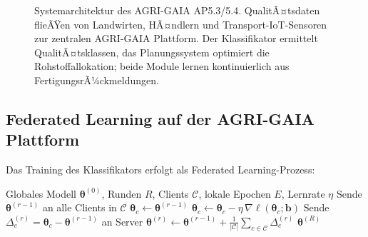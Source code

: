 ﻿\documentclass[12pt,a4paper]{article}
\theoremstyle{plain}
\theoremstyle{definition}
\begin{document}
\begin{figure}[h]
		\caption{Systemarchitektur des AGRI-GAIA AP5.3/5.4. QualitÃ¤tsdaten flieÃŸen
			von Landwirten, HÃ¤ndlern und Transport-IoT-Sensoren zur zentralen
			AGRI-GAIA Plattform. Der Klassifikator ermittelt QualitÃ¤tsklassen,
			das Planungssystem optimiert die Rohstoffallokation; beide Module
			lernen kontinuierlich aus FertigungsrÃ¼ckmeldungen.}
		\label{fig:architektur}
	\end{figure}
	
	\subsection{Federated Learning auf der AGRI-GAIA Plattform}
	
	Das Training des Klassifikators erfolgt als Federated Learning-Prozess:
	
	\begin{algorithm}[h]
		\caption{Federated Training des Kartoffel-Klassifikators (FedAvg)}
		\label{alg:fedavg}
		\begin{algorithmic}[1]
			\Require Globales Modell $\boldsymbol{\theta}^{(0)}$, Runden $R$,
			Clients $\mathcal{C}$, lokale Epochen $E$, Lernrate $\eta$
			\State Sende $\boldsymbol{\theta}^{(r-1)}$ an alle Clients in $\mathcal{C}$
			\State $\boldsymbol{\theta}_c \gets \boldsymbol{\theta}^{(r-1)}$
			\State $\boldsymbol{\theta}_c \gets \boldsymbol{\theta}_c -
			\eta\,\nabla\ell(\boldsymbol{\theta}_c; \mathbf{b})$
			\EndFor
			\EndFor
			\State Sende $\Delta_c^{(r)} = \boldsymbol{\theta}_c -
			\boldsymbol{\theta}^{(r-1)}$ an Server
			\EndFor
			\State $\boldsymbol{\theta}^{(r)} \gets \boldsymbol{\theta}^{(r-1)} +
			\frac{1}{|\mathcal{C}|} \sum_{c \in \mathcal{C}} \Delta_c^{(r)}$
			\EndFor
			\State \Return $\boldsymbol{\theta}^{(R)}$
		\end{algorithmic}
	\end{algorithm}
	
\end{document}
